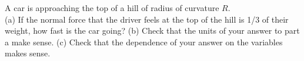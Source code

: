A car is approaching the top of a hill of radius of curvature $R$.\\
%
(a) If the normal force that the driver feels at the top of the hill
is 1/3 of their weight, how fast is the car going?\answercheck\hwendpart
%
(b) Check that the units of your answer to part a make sense.\hwendpart
%
(c) Check that the dependence of your answer on the variables makes sense.\hwendpart
